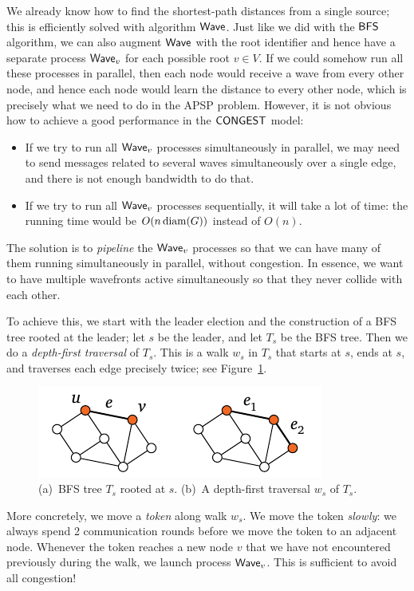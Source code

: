 We already know how to find the shortest-path distances from a single source; this is efficiently solved with algorithm $\textup{\sffamily Wave}$. Just like we did with the $\textup{\sffamily BFS}$ algorithm, we can also augment $\textup{\sffamily Wave}$ with the root identifier and hence have a separate process $\textup{\sffamily Wave}_v$ for each possible root $v \in V$. If we could somehow run all these processes in parallel, then each node would receive a wave from every other node, and hence each node would learn the distance to every other node, which is precisely what we need to do in the APSP problem. However, it is not obvious how to achieve a good performance in the $\textup{\sffamily CONGEST}$ model:
\begin{itemize}
    \item If we try to run all $\textup{\sffamily Wave}_v$ processes simultaneously in parallel, we may need to send messages related to several waves simultaneously over a single edge, and there is not enough bandwidth to do that.
    \item If we try to run all $\textup{\sffamily Wave}_v$ processes sequentially, it will take a lot of time: the running time would be $O(n \operatorname{diam}(G))$ instead of $O(n)$.
\end{itemize}
The solution is to \emph{pipeline} the $\textup{\sffamily Wave}_v$ processes so that we can have many of them running simultaneously in parallel, without congestion. In essence, we want to have multiple wavefronts active simultaneously so that they never collide with each other.

To achieve this, we start with the leader election and the construction of a BFS tree rooted at the leader; let $s$ be the leader, and let $T_s$ be the BFS tree. Then we do a \emph{depth-first traversal} of $T_s$. This is a walk $w_s$ in $T_s$ that starts at $s$, ends at $s$, and traverses each edge precisely twice; see Figure~\ref{fig:dfs}.

\begin{figure}
    \centering
    \includegraphics[page=\PDFS]{figs.pdf}
    \caption{(a)~BFS tree $T_s$ rooted at $s$. (b)~A depth-first traversal $w_s$ of $T_s$.}\label{fig:dfs}
\end{figure}

More concretely, we move a \emph{token} along walk $w_s$. We move the token \emph{slowly}: we always spend 2 communication rounds before we move the token to an adjacent node. Whenever the token reaches a new node $v$ that we have not encountered previously during the walk, we launch process $\textup{\sffamily Wave}_v$. This is sufficient to avoid all congestion!

